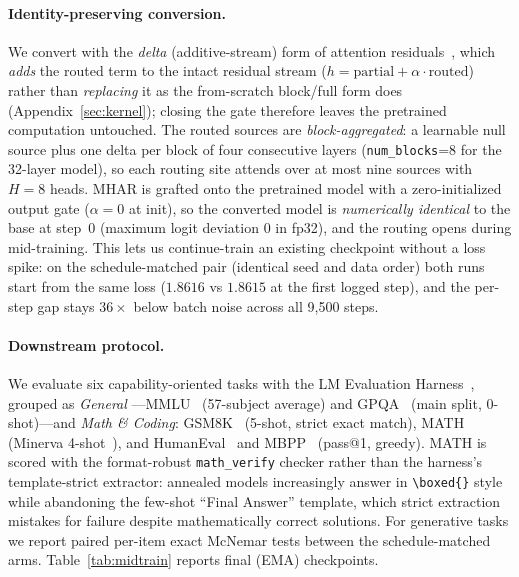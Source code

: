 \documentclass{article}
\begin{document}
\paragraph{Identity-preserving conversion.} We convert with the \emph{delta}
(additive-stream) form of attention residuals~\citep{luo2026delta}, which
\emph{adds} the routed term to the intact residual stream
($h{=}\mathrm{partial}+\alpha\cdot\mathrm{routed}$) rather than \emph{replacing}
it as the from-scratch block/full form does (Appendix~\ref{sec:kernel}); closing
the gate therefore leaves the pretrained computation untouched. The routed
sources are \emph{block-aggregated}: a learnable null source plus one delta per
block of four consecutive layers (\texttt{num\_blocks}{=}8 for the 32-layer
model), so each routing site attends over at most nine sources with $H{=}8$
heads. MHAR is grafted onto the pretrained model with a zero-initialized output
gate ($\alpha{=}0$ at init), so the converted model is \emph{numerically
identical} to the base at step~0 (maximum logit deviation $0$ in fp32), and the
routing opens during mid-training. This lets us continue-train an existing
checkpoint without a loss spike: on the schedule-matched pair (identical seed
and data order) both runs start from the same loss ($1.8616$ vs $1.8615$ at the
first logged step), and the per-step gap stays $36\times$ below batch noise
across all 9{,}500 steps.

\paragraph{Downstream protocol.} We evaluate six capability-oriented tasks
with the LM Evaluation Harness~\citep{eval-harness}, grouped as \emph{General}
---MMLU~\citep{hendrycks2021mmlu} (57-subject average) and
GPQA~\citep{rein2024gpqa} (main split, 0-shot)---and \emph{Math \& Coding}:
GSM8K~\citep{cobbe2021gsm8k} (5-shot, strict exact match),
MATH~\citep{hendrycks2021mathdataset} (Minerva
4-shot~\citep{lewkowycz2022minerva}), and HumanEval~\citep{chen2021codex}
and MBPP~\citep{austin2021mbpp} (pass@1, greedy). MATH is scored with
the format-robust \texttt{math\_verify} checker rather than the harness's
template-strict extractor: annealed models increasingly answer in
\texttt{\textbackslash boxed\{\}} style while abandoning the few-shot
``Final Answer'' template, which strict extraction mistakes for failure despite
mathematically correct solutions. For generative tasks we report paired
per-item exact McNemar tests between the schedule-matched arms.
Table~\ref{tab:midtrain} reports final (EMA) checkpoints.
\end{document}
